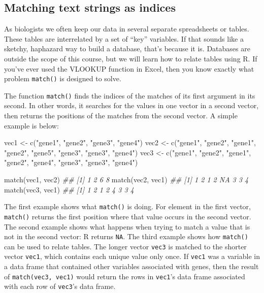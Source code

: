 \documentclass[
  13,
  letterpaper,
]{report}
\newenvironment{Shaded}{\begin{snugshade}}{\end{snugshade}}
\newcommand{\DocumentationTok}[1]{\textcolor[rgb]{0.37,0.37,0.37}{\textit{#1}}}
\newcommand{\FunctionTok}[1]{\textcolor[rgb]{0.28,0.35,0.67}{#1}}
\newcommand{\NormalTok}[1]{\textcolor[rgb]{0.00,0.23,0.31}{#1}}
\newcommand{\OtherTok}[1]{\textcolor[rgb]{0.00,0.23,0.31}{#1}}
\newcommand{\StringTok}[1]{\textcolor[rgb]{0.13,0.47,0.30}{#1}}
\begin{document}
\subsection{Matching text strings as indices}\label{sec-04-char-inds}

As biologists we often keep our data in several separate spreadsheets or
tables. These tables are interrelated by a set of ``key'' variables. If
that sounds like a sketchy, haphazard way to build a database, that's
because it is. Databases are outside the scope of this course, but we
will learn how to relate tables using R. If you've ever used the VLOOKUP
function in Excel, then you know exactly what problem \texttt{match()}
is designed to solve.

The function \texttt{match()} finds the indices of the matches of its
first argument in its second. In other words, it searches for the values
in one vector in a second vector, then returns the positions of the
matches from the second vector. A simple example is below:

\begin{Shaded}
\begin{Highlighting}[]

\NormalTok{vec1 }\OtherTok{\textless{}{-}} \FunctionTok{c}\NormalTok{(}\StringTok{"gene1"}\NormalTok{, }\StringTok{"gene2"}\NormalTok{, }\StringTok{"gene3"}\NormalTok{, }\StringTok{"gene4"}\NormalTok{)}
\NormalTok{vec2 }\OtherTok{\textless{}{-}} \FunctionTok{c}\NormalTok{(}\StringTok{"gene1"}\NormalTok{, }\StringTok{"gene2"}\NormalTok{, }\StringTok{"gene1"}\NormalTok{, }\StringTok{"gene2"}\NormalTok{, }
          \StringTok{"gene5"}\NormalTok{, }\StringTok{"gene3"}\NormalTok{, }\StringTok{"gene3"}\NormalTok{, }\StringTok{"gene4"}\NormalTok{)}
\NormalTok{vec3 }\OtherTok{\textless{}{-}} \FunctionTok{c}\NormalTok{(}\StringTok{"gene1"}\NormalTok{, }\StringTok{"gene2"}\NormalTok{, }\StringTok{"gene1"}\NormalTok{, }\StringTok{"gene2"}\NormalTok{, }
          \StringTok{"gene4"}\NormalTok{, }\StringTok{"gene3"}\NormalTok{, }\StringTok{"gene3"}\NormalTok{, }\StringTok{"gene4"}\NormalTok{)}

\FunctionTok{match}\NormalTok{(vec1, vec2)}
\DocumentationTok{\#\# [1] 1 2 6 8}
\FunctionTok{match}\NormalTok{(vec2, vec1)}
\DocumentationTok{\#\# [1]  1  2  1  2 NA  3  3  4}
\FunctionTok{match}\NormalTok{(vec3, vec1)}
\DocumentationTok{\#\# [1] 1 2 1 2 4 3 3 4}
\end{Highlighting}
\end{Shaded}

The first example shows what \texttt{match()} is doing. For element in
the first vector, \texttt{match()} returns the first position where that
value occurs in the second vector. The second example shows what happens
when trying to match a value that is not in the second vector: R returns
\texttt{NA}. The third example shows how \texttt{match()} can be used to
relate tables. The longer vector \texttt{vec3} is matched to the shorter
vector \texttt{vec1}, which contains each unique value only once. If
\texttt{vec1} was a variable in a data frame that contained other
variables associated with genes, then the result of
\texttt{match(vec3,\ vec1)} would return the rows in \texttt{vec1}'s
data frame associated with each row of \texttt{vec3}'s data frame.
\end{document}
